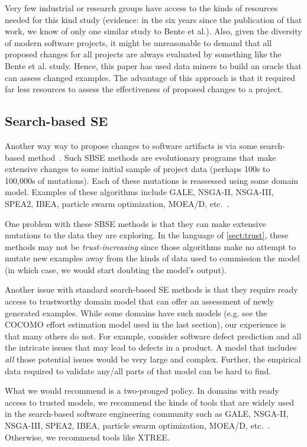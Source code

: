 \documentclass{sig-alternate}
\newcommand{\tion}[1]{\textsection\ref{sect:#1}}
\begin{document}
Very few industrial or research groups have access
to the kinds of resources needed for this kind study  (evidence: in the six years since the
publication of that work, we know of only one   similar study to Bente et al.). Also, given the
diversity of modern software projects, it might be unreasonable to demand that all
proposed changes for all projects are always evaluated by something like the Bente et al. study.
Hence, 
this paper has used data miners to build an oracle that can assess changed examples. The advantage
of this approach is that it required far less resources to assess the effectiveness of proposed
changes to a project.  

\subsection{Search-based SE}

Another way way to propose changes to software artifacts
is   via some search-based method~\cite{Harman2009,Harman2011}. Such SBSE methods are   evolutionary programs that 
make
 extensive changes to  some initial sample of project data
 (perhaps 
100s to 100,000s of mutations). Each of these mutations
is reassessed using some domain model.
Examples of these algorithms include GALE, NSGA-II, NSGA-III, SPEA2, IBEA, particle swarm optimization, MOEA/D, etc.~\cite{krall14,deb00a,zit02,zit04,%
deb14,Cui2005a,zhang07:TEC}.

One problem with these   SBSE methods is that they can  make extensive mutations to the data they are exploring. In the language
of \tion{trust}, these methods may not be {\em trust-increasing} since those algorithms make no attempt
to mutate new examples away from the kinds of data used to commission the model (in which case, we would
start doubting the model's output).

Another issue with standard search-based SE methods is that they require ready access to 
trustworthy domain model that can offer an assessment
of newly generated examples. While some domains have such models (e.g. see the COCOMO effort estimation model
used in the last section), our experience is that many others do not.  For example, 
consider software defect prediction and all the intricate issues that may lead to defects in a product. A model that includes {\em all} those
potential issues would be very large and complex. Further,
the empirical data required to validate any/all parts
of that model can be hard to find.

What we would recommend is a two-pronged policy.
In domains with ready access to trusted models, we recommend
the kinds of tools that are widely used in the search-based
software engineering community such as GALE, NSGA-II, NSGA-III, SPEA2, IBEA, particle swarm optimization, MOEA/D, etc.~\cite{krall14,deb00a,zit02,zit04,%
deb14,Cui2005a,zhang07:TEC}. Otherwise, we recommend tools like XTREE.
\end{document}
